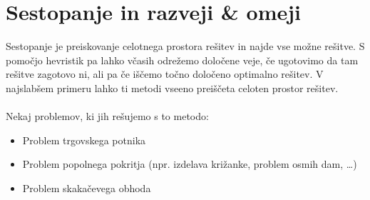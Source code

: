 \documentclass[10pt,a4paper,oneside]{book}
\newenvironment{items}{
\begin{itemize}
  \setlength{\itemsep}{1pt}
  \setlength{\parskip}{0pt}
  \setlength{\parsep}{0pt}
}{\end{itemize}}
\begin{document}
\section{Sestopanje in razveji \& omeji}
Sestopanje je preiskovanje celotnega prostora rešitev in najde vse možne rešitve. S pomočjo hevristik pa lahko včasih odrežemo določene veje, če ugotovimo da tam rešitve zagotovo ni, ali pa če iščemo točno določeno optimalno rešitev. V najslabšem primeru lahko ti metodi vseeno preiščeta celoten prostor rešitev.\\
 \\
Nekaj problemov, ki jih rešujemo s to metodo:
\begin{items}
	\item Problem trgovskega potnika
	\item Problem popolnega pokritja (npr. izdelava križanke, problem osmih dam, \dots)
	\item Problem skakačevega obhoda
\end{items}
\end{document}
